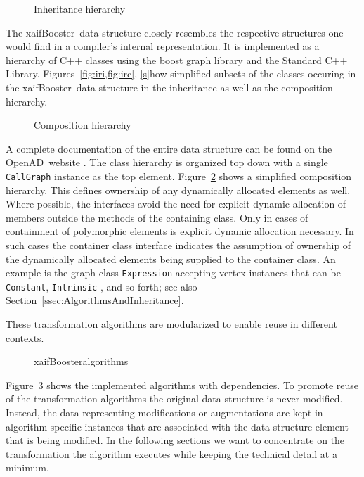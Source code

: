 \documentclass[acmtocl,acmnow]{acmtrans2m}
\newcommand{\OpenAD}{OpenAD}
\newcommand{\xaifBooster}{xaifBooster}
\newcommand{\code}[1]{{\small\tt{#1}}}
\newcommand{\reffig}[1]{Figure~\ref{#1}}
\newcommand{\reffigs}[2]{Figures~\ref{#1}, \ref{#2}}
\newcommand{\refsec}[1]{Section~\ref{#1}}
\begin{document}
\begin{figure}
\centering {}
\caption{Inheritance hierarchy} \label{fig:iri}
\end{figure}

The \xaifBooster\ data structure  
closely resembles the respective structures one would find in a 
compiler's internal representation. 
It is implemented as a hierarchy of C++ classes 
using the boost graph library \cite{boostWeb}
and the Standard C++ Library\cite{libstdcWeb}.
\reffigs{fig:iri,fig:irc} show simplified subsets of the classes 
occuring in the \xaifBooster\ data structure in the inheritance 
as well as the composition hierarchy.  
\begin{figure}[htb]
\centering {}
\caption{Composition hierarchy} \label{fig:irc}
\end{figure}

A complete documentation of the entire data structure 
can be found on the \OpenAD\ website \cite{openadWeb}.
The class hierarchy is organized top down with 
a single \code{CallGraph} instance as the top element. 
\reffig{fig:irc} shows  a simplified composition hierarchy.
This defines ownership of any dynamically allocated elements as well. Where possible,
the interfaces avoid the need for explicit dynamic allocation of members outside the methods of the 
containing class. Only in cases of containment of polymorphic elements is explicit dynamic allocation 
necessary. In such cases the container class interface indicates the assumption of ownership of 
the dynamically allocated elements being supplied to the container class. An example is the 
graph class \code{Expression} accepting vertex instances that can be \code{Constant}, \code{Intrinsic} , and so forth; 
see also \refsec{ssec:AlgorithmsAndInheritance}.

These transformation algorithms are modularized to enable reuse in different 
contexts. 
\begin{figure}
\centering {}
\caption{\xaifBooster algorithms} \label{fig:allAlgs}
\end{figure}
\reffig{fig:allAlgs} shows the implemented algorithms with dependencies.
To promote reuse of the transformation algorithms the original data structure 
is never modified. Instead, the data representing modifications or augmentations
are kept in algorithm specific instances that are associated with the 
data structure element that is being modified. 
In the following sections we want to concentrate on the transformation 
the algorithm executes while keeping the technical detail at a minimum. 
 
\end{document}
